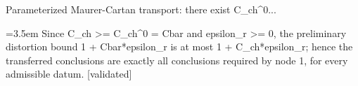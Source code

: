 \documentclass{article}
\newcommand{\step}[1]{\par\noindent\hangindent=3.5em\hangafter=1%
  \makebox[3.5em][l]{\textbf{#1.}}}
\newcommand{\steptag}[1]{\hfill{\small\textsf{[#1]}}}
\begin{document}
\begin{proofbox}{Parameterized Maurer-Cartan transport: there exist C\_ch\textasciicircum{}0...}
\step{1.4} Since C\_ch >= C\_ch\textasciicircum{}0 = Cbar and epsilon\_r >= 0, the preliminary distortion bound 1 + Cbar*epsilon\_r is at most 1 + C\_ch*epsilon\_r; hence the transferred conclusions are exactly all conclusions required by node 1, for every admissible datum. \steptag{validated} \\[4pt]
\end{proofbox}
\end{document}
